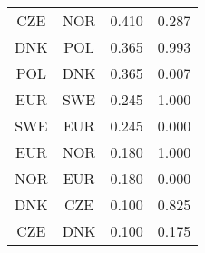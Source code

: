 \begin{table}[!h]
\begin{tabular}[t]{cccc}
CZE & NOR & 0.410 & 0.287\\
DNK & POL & 0.365 & 0.993\\
\addlinespace
POL & DNK & 0.365 & 0.007\\
EUR & SWE & 0.245 & 1.000\\
SWE & EUR & 0.245 & 0.000\\
EUR & NOR & 0.180 & 1.000\\
NOR & EUR & 0.180 & 0.000\\
\addlinespace
DNK & CZE & 0.100 & 0.825\\
CZE & DNK & 0.100 & 0.175\\
\bottomrule
\end{tabular}
\end{table}
